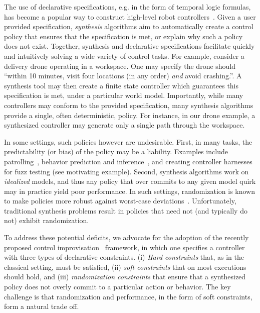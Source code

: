 The use of declarative specifications, e.g. in the form of temporal logic formulas, has become a popular way to construct high-level robot controllers~\cite{DBLP:conf/iros/HorowitzWM14, DBLP:conf/rss/WongEK14, DBLP:conf/iros/HeLKV17, DBLP:conf/icra/FuATP16, DBLP:conf/icra/HeWKV19, DBLP:journals/arobots/MoarrefK20, DBLP:conf/icra/KantarosM0P20}.
Given a user provided specification, \emph{synthesis} algorithms aim
to automatically create a control policy that ensures that the
specification is met, or explain why such a policy does not
exist. Together, synthesis and declarative specifications facilitate
quickly and intuitively solving a wide variety of control tasks.  For
example, consider a delivery drone operating in a workspace. One may
specify the drone should ``within 10 minutes, visit four locations (in any
order) \emph{and} avoid crashing.''. A synthesis tool may then create a
finite state controller which guarantees this specification is met,
under a particular world model.
Importantly, while many controllers may conform to the
provided specification, many synthesis algorithms provide a
single, often deterministic, policy.  For instance, in our drone
example, a synthesized controller may generate only a single path
through the workspace.

In some settings, such policies however are undesirable.  First, in
many tasks, the predictability (or bias) of the policy may be a
liability.  Examples include
patrolling~\cite{DBLP:journals/ior/AlpernMP11}, behavior prediction
and inference~\cite{DBLP:conf/cav/Vazquez-Chanlatte20}, and creating
controller harnesses for fuzz testing (see motivating
example). Second, synthesis algorithms work on \emph{idealized}
models, and thus any policy that over commits to any given model quirk
may in practice yield poor performance. In such settings,
randomization is known to make policies more robust against worst-case
deviations~\cite{mceThesis, maxEntAnswer}. Unfortunately, traditional
synthesis problems result in policies that need not (and typically do
not) exhibit randomization.

To address these potential deficits, we advocate for the adoption of
the recently proposed control
improvisation~\cite{DBLP:conf/cav/FremontS18,DBLP:conf/fsttcs/FremontDSW15}
framework, in which one specifies a controller with three types of
declarative constraints. (i) \emph{Hard constraints} that, as in the
classical setting, must be satisfied, (ii) \emph{soft constraints} that
on most executions should hold, and (iii) \emph{randomization
constraints} that ensure that a synthesized policy does not overly
commit to a particular action or behavior. 
The key challenge is that randomization and performance, in the form of soft constraints, form a natural trade off.

